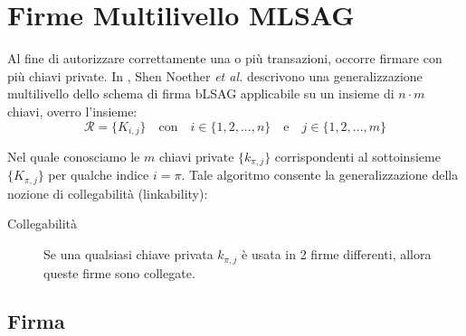 \section{Firme Multilivello MLSAG}
\label{sec:MLSAG}

Al fine di autorizzare correttamente una o più transazioni, occorre firmare con più chiavi private. In \cite{MRL-0005-ringct}, Shen Noether {\em et al.} descrivono una generalizzazione multilivello dello schema di firma bLSAG applicabile su un insieme di \(n \cdot m\) chiavi, overro l’insieme:\vspace{.175cm}
\[\mathcal{R} = \{K_{i,j}\}  \quad \textrm{con} \quad  i \in \{1, 2, ..., n\} \quad \textrm{e} \quad j \in \{1, 2, ..., m\}\]

Nel quale conosciamo le $m$ chiavi private \(\{k_{\pi, j}\}\) corrispondenti al sottoinsieme \(\{K_{\pi, j}\}\) per qualche indice \(i = \pi\). Tale algoritmo consente la generalizzazione della nozione di collegabilità (linkability):
\begin{description}
	\item[Collegabilità] Se una qualsiasi chiave privata \(k_{\pi, j}\) è usata in 2 firme differenti, allora queste firme sono collegate.
\end{description}


\subsection*{Firma}

